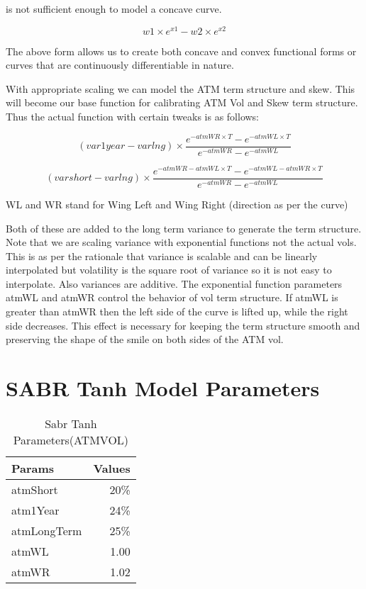 \documentclass[a4paper, 12pt]{article}
\begin{document}
is not sufficient enough to model a concave curve. 


\begin{equation}
  w1 \times e^{x1} - w2 \times e^{x2} 
\end{equation}


The above form allows us to create both concave and convex functional forms or curves that are continuously differentiable in nature. 

With appropriate scaling we can model the ATM term structure and skew. 
This will become our base function for calibrating ATM Vol and Skew term structure. 
Thus the actual function with certain tweaks is as follows:


\begin{equation}
(var1year-varlng) \times \frac{e^{-atmWR \times T} -
e^{-atmWL \times T}}{e^{-atmWR} - e^{-atmWL}}  
\end{equation}


\begin{equation}
(varshort-varlng) \times \frac{e^{-atmWR - atmWL \times T} -
e^{-atmWL -atmWR \times T}}{e^{-atmWR} - e^{-atmWL}}  
\end{equation}

WL and WR stand for Wing Left and Wing Right (direction as per the curve)

Both of these are added to the long term variance to generate the term structure. Note that we are scaling variance with exponential functions not the actual vols. This is as per the rationale that variance is scalable and can be linearly interpolated but volatility is the square root of variance so it is not easy to interpolate. Also variances are additive. 
The exponential function parameters atmWL and atmWR control the behavior of vol term structure. If atmWL is greater than atmWR then the left side of the curve is lifted up, while the right side decreases. This effect is necessary for keeping the term structure smooth and preserving the shape of the smile on both sides of the ATM vol. 


\section{SABR Tanh Model Parameters}

\normalfont

\begin{table}[h]
\centering
\begin{tabular}{l|r}
Params & Values \\\hline
atmShort & 20\% \\
atm1Year & 24\% \\
atmLongTerm & 25\% \\
atmWL & 1.00  \\
atmWR & 1.02 \\
\end{tabular}
\caption{\label{tab:voltable}Sabr Tanh Parameters(ATMVOL)}
\end{table}
\end{document}
